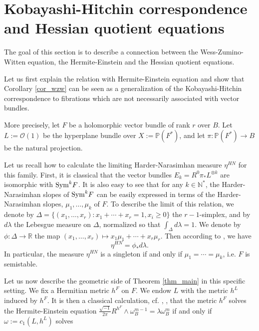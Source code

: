 \documentclass[12pt]{article}
\numberwithin{equation}{section}
\theoremstyle{theorem}
\theoremstyle{definition}
\theoremstyle{remark}
\newcommand{\imun} {\sqrt{-1}}
\newcommand{\real}{\mathbb{R}}
\newcommand{\nat}{\mathbb{N}}
\begin{document}
	\section{Kobayashi-Hitchin correspondence and Hessian quotient equations}\label{sect_j_eq}
	The goal of this section is to describe a connection between the Wess-Zumino-Witten equation, the Hermite-Einstein and the Hessian quotient equations.
	\par 
	Let us first explain the relation with Hermite-Einstein equation and show that Corollary \ref{cor_wzw} can be seen as a generalization of the Kobayashi-Hitchin correspondence to fibrations which are not necessarily associated with vector bundles.
	\par 
	More precisely, let $F$ be a holomorphic vector bundle of rank $r$ over $B$. 
	Let $L := \mathcal{O}(1)$ be the hyperplane bundle over $X := \mathbb{P}(F^*)$, and let $\pi : \mathbb{P}(F^*) \to B$ be the natural projection.
	\par 
	Let us recall how to calculate the limiting Harder-Narasimhan measure $\eta^{HN}$ for this family.
	First, it is classical that the vector bundles $E_k = R^0 \pi_* L^{\otimes k}$ are isomorphic with ${\rm{Sym}}^k F$.
	It is also easy to see that for any $k \in \nat^*$, the Harder-Narasimhan slopes of ${\rm{Sym}}^k F$ can be easily expressed in terms of the Harder-Narasimhan slopes, $\mu_1, \ldots, \mu_k$ of $F$.
	To describe the limit of this relation, we denote by $\Delta = \{(x_1, \ldots, x_r) : x_1 + \cdots + x_r = 1, x_i \geq 0 \}$ the $r - 1$-simplex, and by $d \lambda$ the Lebesgue measure on $\Delta$, normalized so that $\int_{\Delta} d \lambda = 1$.
	We denote by $\phi : \Delta \to \real$ the map $(x_1, \ldots, x_r) \mapsto x_1 \mu_1 + \cdots + x_r \mu_r$.
	Then according to \cite[Proposition 3.5]{ChenVolume}, we have 
	\begin{equation}\label{eq_chen_volume_calccc}
		\eta^{HN} = \phi_* d \lambda.
	\end{equation}
	In particular, the measure $\eta^{HN}$ is a singleton if and only if $\mu_1 = \cdots = \mu_k$, i.e. $F$ is semistable.
	\par 
	Let us now describe the geometric side of Theorem \ref{thm_main} in this specific setting.
	We fix a Hermitian metric $h^F$ on $F$.
	We endow $L$ with the metric $h^L$ induced by $h^F$.
	It is then a classical calculation, cf. \cite{KobFinEins}, \cite[Lemma 3.3 and Remark 3.4]{FinHNII}, that the metric $h^F$ solves the Hermite-Einstein equation $\frac{\imun}{2 \pi} R^{h^F} \wedge \omega_B^{m-1} = \lambda \omega_B^m$  if and only if $\omega := c_1(L, h^L)$ solves
\end{document}
